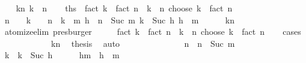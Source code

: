 \begin{isabellebody}
\ \ \isamarkupfalse%
\ kn{\isacharcolon}{\kern0pt}\ {\isachardoublequoteopen}k\ {\isasymle}\ n{\isachardoublequoteclose}\isanewline
\ \ \isamarkupfalse%
\ {\isacharquery}{\kern0pt}ths\ {\isacharequal}{\kern0pt}\ {\isachardoublequoteopen}fact\ k\ {\isacharasterisk}{\kern0pt}\ fact\ {\isacharparenleft}{\kern0pt}n\ {\isacharminus}{\kern0pt}\ k{\isacharparenright}{\kern0pt}\ {\isacharasterisk}{\kern0pt}\ {\isacharparenleft}{\kern0pt}n\ choose\ k{\isacharparenright}{\kern0pt}\ {\isacharequal}{\kern0pt}\ fact\ n{\isachardoublequoteclose}\isanewline
\ \ \isamarkupfalse%
\ {\isachardoublequoteopen}n\ {\isacharequal}{\kern0pt}\ {}\ {\isasymor}\ k\ {\isacharequal}{\kern0pt}\ {}\ {\isasymor}\ n\ {\isacharequal}{\kern0pt}\ k{\isachardoublequoteclose}\ {\isacharbar}{\kern0pt}\ m\ h\ \ {\isachardoublequoteopen}n\ {\isacharequal}{\kern0pt}\ Suc\ m{\isachardoublequoteclose}\ {\isachardoublequoteopen}k\ {\isacharequal}{\kern0pt}\ Suc\ h{\isachardoublequoteclose}\ {\isachardoublequoteopen}h\ {\isacharless}{\kern0pt}\ m{\isachardoublequoteclose}\isanewline
\ \ \ \ \isamarkupfalse%
\ kn\ \isamarkupfalse%
\ atomize{\isacharunderscore}{\kern0pt}elim\ presburger\isanewline
\ \ \isamarkupfalse%
\ \isamarkupfalse%
\ {\isachardoublequoteopen}fact\ k\ {\isacharasterisk}{\kern0pt}\ fact\ {\isacharparenleft}{\kern0pt}n\ {\isacharminus}{\kern0pt}\ k{\isacharparenright}{\kern0pt}\ {\isacharasterisk}{\kern0pt}\ {\isacharparenleft}{\kern0pt}n\ choose\ k{\isacharparenright}{\kern0pt}\ {\isacharequal}{\kern0pt}\ fact\ n{\isachardoublequoteclose}\isanewline
\ \ \isamarkupfalse%
\ cases\isanewline
\ \ \ \ \isamarkupfalse%
\ {}\isanewline
\ \ \ \ \isamarkupfalse%
\ kn\ \isamarkupfalse%
\ {\isacharquery}{\kern0pt}thesis\ \isamarkupfalse%
\ auto\isanewline
\ \ \isamarkupfalse%
\isanewline
\ \ \ \ \isamarkupfalse%
\ {}\isanewline
\ \ \ \ \isamarkupfalse%
\ n\ {\isacharequal}{\kern0pt}\ {\isacartoucheopen}n\ {\isacharequal}{\kern0pt}\ Suc\ m{\isacartoucheclose}\isanewline
\ \ \ \ \isamarkupfalse%
\ k\ {\isacharequal}{\kern0pt}\ {\isacartoucheopen}k\ {\isacharequal}{\kern0pt}\ Suc\ h{\isacartoucheclose}\isanewline
\ \ \ \ \isamarkupfalse%
\ hm\ {\isacharequal}{\kern0pt}\ {\isacartoucheopen}h\ {\isacharless}{\kern0pt}\ m{\isacartoucheclose}\isanewline

\end{isabellebody}
